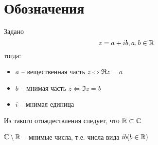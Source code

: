 \documentclass[main]{subfiles}
\begin{document}
\section*{Обозначения}
Задано \[z = a + ib, a,b \in \mathbb{R} \] тогда:
\begin{itemize}
    \item $a$ -- вещественная часть $z \Leftrightarrow \Re z =a$
    \item $b$ -- мнимая часть $z \Leftrightarrow \Im z = b$
    \item $i$ -- мнимая единица
\end{itemize}
Из такого отождествления следует, что $\mathbb{R} \subset \mathbb{C}$

$\mathbb{C} \setminus \mathbb{R}$ -- мнимые числа, т.е. числа вида $ib (b\in \mathbb{R})$
\end{document}
